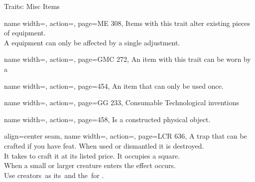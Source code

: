 \begin{PageFrontLandscape}
\begin{TablesHalf}{\frontTableHeight}
\begin{Table}{Traits: Misc Items}
\begin{entry}{}{%
                name width=\conditionLength,%
                action=\Adjustment,
                page=ME 308,
            }
                Items with this trait alter existing pieces of equipment. \hfill
                \\
                A equipment can only be affected by a single adjustment. \hfill
            \end{entry}
            \begin{entry}{}{%
                name width=\conditionLength,%
                action=\Companion,
                page=GMC 272,
            }
                An item with this trait can be worn by a 
            \end{entry}
            \begin{entry}{}{%
                name width=\conditionLength,%
                action=\Consumable,
                page=454,
            }
                An item that can only be used once. \hfill
            \end{entry}
            \begin{entry}{}{%
                name width=\conditionLength,%
                action=\Gadget,
                page=GG 233,
            }
                Consumable Technological inventions
            \end{entry}
            \begin{entry}{}{%
                name width=\conditionLength,%
                action=\Mechanical,
                page=458,
            }
                Is a constructed physical object.
            \end{entry}
            \begin{entry}{}{%
                align=center seam,
                name width=\conditionLength,%
                action=\Snare,
                page=LCR 636,
            }
                A trap that can be crafted if you have  feat.
                When used or dismantled it is destroyed.\\
                It takes  to craft it at its listed price.
                It occupies a  \Feet square. \hfill
                \\
                When a small or larger creature enters the effect occurs.\\
                Use creators \CraftingT \DC\,as its \StealthT \DC\,and the \DC\,for . \hfill

\end{entry}
\end{Table}
\end{TablesHalf}
\end{PageFrontLandscape}
